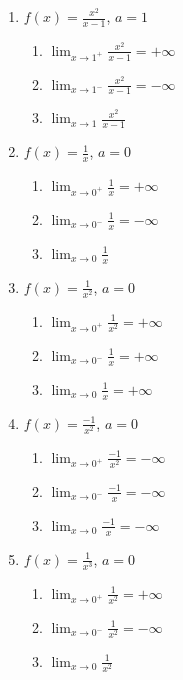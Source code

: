 \documentclass[a4paper, 12pt]{article}
\begin{document}
\begin{enumerate}
\begin{enumerate}
        \item $f(x) = \frac{x^2}{x-1}$, $a=1$
        
        \begin{enumerate}
            \item $\lim_{x \to 1^+} \frac{x^2}{x-1} = + \infty$
            \item $\lim_{x \to 1^-} \frac{x^2}{x-1} = - \infty$
            \item $\lim_{x \to 1} \frac{x^2}{x-1}$ \naoexiste
        \end{enumerate}

        \item $f(x) = \frac{1}{x}$, $a=0$
        
        \begin{enumerate}
            \item $\lim_{x \to 0^+} \frac{1}{x} = + \infty$
            \item $\lim_{x \to 0^-} \frac{1}{x} = - \infty$
            \item $\lim_{x \to 0} \frac{1}{x}$ \naoexiste
        \end{enumerate}

        \item $f(x) = \frac{1}{x^2}$, $a=0$
        
        \begin{enumerate}
            \item $\lim_{x \to 0^+}\frac{1}{x^2} = + \infty$
            \item $\lim_{x \to 0^-} \frac{1}{x} = + \infty$
            \item $\lim_{x \to 0} \frac{1}{x} = + \infty$
        \end{enumerate}

        \item $f(x) = \frac{-1}{x^2}$, $a=0$
        
        \begin{enumerate}
            \item $\lim_{x \to 0^+}\frac{-1}{x^2} = - \infty$
            \item $\lim_{x \to 0^-} \frac{-1}{x} = - \infty$
            \item $\lim_{x \to 0} \frac{-1}{x} = - \infty$
        \end{enumerate}

        \item $f(x)= \frac{1}{x^3}$, $a=0$
        
        \begin{enumerate}
            \item $\lim_{x \to 0^+} \frac{1}{x^2} = + \infty$
            \item $\lim_{x \to 0^-} \frac{1}{x^2} = - \infty$
            \item $\lim_{x \to 0} \frac{1}{x^2}$ \naoexiste
        \end{enumerate}


\end{enumerate}
\end{enumerate}
\end{document}
